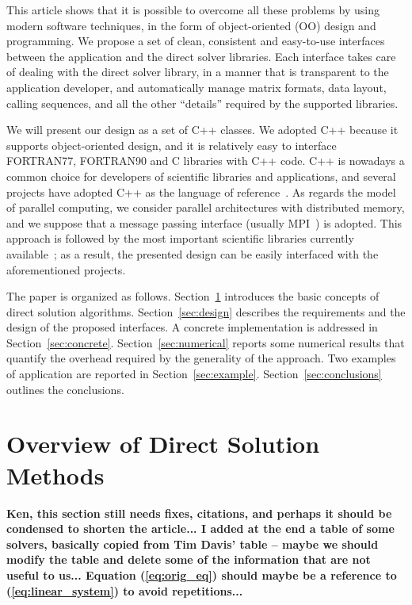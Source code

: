 \documentclass[acmtocl]{acmtrans2m}
\begin{document}
This article shows that it is possible to overcome all these problems by using
modern software techniques, in the form of object-oriented (OO) design and
programming.  We propose a set of clean, consistent and easy-to-use interfaces
between the application and the direct solver libraries.  Each interface takes
care of dealing with the direct solver library, in a manner that is
transparent to the application developer, and automatically manage matrix
formats, data layout, calling sequences, and all the other ``details''
required by the supported libraries. 

\smallskip

We will present our design as a set of C++ classes. We adopted C++ because it
supports object-oriented design, and it is relatively easy to interface
FORTRAN77, FORTRAN90 and C libraries with C++ code. C++ is nowadays a common
choice for developers  of scientific libraries and applications, and several
projects have adopted C++ as the language of
reference~\cite{heroux05trilinos}. 
As regards the model of parallel computing,
we consider parallel architectures with distributed memory, and we suppose
that a message passing interface (usually MPI~\cite{gropp98mpi}) is adopted.
This approach is followed by the most important scientific libraries currently
available~\cite{heroux05trilinos,petsc-user-ref,falgout02hypre}; as a result, the presented
design can be easily interfaced with the aforementioned projects.

\smallskip

The paper is organized as follows. Section~\ref{sec:overview} introduces the
basic concepts of direct solution algorithms. Section~\ref{sec:design}
describes the requirements and the design of the proposed
interfaces. A concrete implementation is addressed in
Section~\ref{sec:concrete}. Section~\ref{sec:numerical} reports some
numerical results that quantify the overhead required by the generality of
the approach. Two
examples of application are reported in Section~\ref{sec:example}.
Section~\ref{sec:conclusions} outlines the conclusions.

\section{Overview of Direct Solution Methods}
\label{sec:overview}

{\bf Ken, this section still needs fixes, citations, and perhaps it should
  be condensed to shorten the article... I added at the end a table of some
    solvers, basically copied from Tim Davis' table -- maybe we should modify
the table and delete some of the information that are not useful to us...
Equation (\ref{eq:orig_eq}) should maybe be a reference to
(\ref{eq:linear_system}) to avoid repetitions...}
\end{document}
